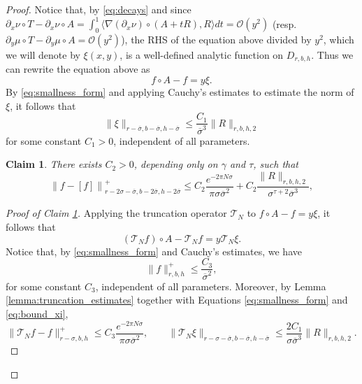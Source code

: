 \documentclass[10pt]{article}
\newtheorem{claim}{Claim}
\newcommand{\Domain}[3]{D_{#1, #2, #3}}
\begin{document}
\begin{proof}
 Notice that, by \eqref{eq:decays} and since $\partial_x\nu \circ T - \partial_x\nu \circ A = \int_0^1 \langle \nabla (\partial_x \nu) \circ (A + tR), R \rangle dt= \mathcal{O}(y^2)$ (resp. $\partial_y\mu \circ T - \partial_y\mu \circ A = \mathcal{O}(y^2)$), the RHS of the equation above divided by $y^2$, which we will denote by $\xi(x, y)$, is a well-defined analytic function on $\Domain{r}{b}{h}$. Thus we can rewrite the equation above as
\begin{equation}
\label{eq:difference_equation_mu_nu}
    f \circ A - f = y \xi.
\end{equation}
By \eqref{eq:smallness_form} and applying Cauchy's estimates to estimate the norm of $\xi$, it follows that 
 \begin{equation}
 \label{eq:bound_xi}
   \|\xi\|_{r - \overline\sigma, b - \overline\sigma, h - \overline \sigma} \leq  \frac{C_1}{\overline \sigma^3}\| R \|_{r,b,h,2}
 \end{equation} 
 for some constant $C_1 > 0$,  independent of all parameters. 
 
 \begin{claim}
 \label{cl:f_minus_average_scheme}
There exists $C_2 > 0$,  depending only on $\gamma$ and $\tau$, such that
\[\left\|f - [f] \right\|_{r - 2\sigma - \overline\sigma, b - 2\overline\sigma, h - 2\overline\sigma}^+ \leq C_2\frac{e^{-2\pi N \sigma}}{\pi \sigma \overline \sigma^2} + C_2\frac{\| R \|_{r,b,h,2}}{\sigma^{\tau + 2} \overline \sigma^3},\]
 \end{claim}
\begin{proof}[Proof of Claim \ref{cl:f_minus_average_scheme}] 
Applying the truncation operator $\mathcal{T}_N$ to $f \circ A - f = y \xi$, it follows that
\[ (\mathcal{T}_Nf) \circ A - \mathcal{T}_Nf = y \mathcal{T}_N\xi. \]
Notice that, by \eqref{eq:smallness_form} and Cauchy's estimates, we have
\[ \| f \|_{r, b, h}^+ \leq \frac{C_3}{\overline \sigma^2}, \]
for some constant $C_3$, independent of all parameters. Moreover, by Lemma \ref{lemma:truncation_estimates} together with Equations \eqref{eq:smallness_form} and \eqref{eq:bound_xi}, 
\[ \|\mathcal{T}_N f - f \|_{r - \sigma, b, h}^+ \leq C_3\frac{e^{-2\pi N \sigma}}{\pi \sigma \overline \sigma^2}, %
\qquad \|\mathcal{T}_N \xi \|_{r - \sigma - \overline\sigma, b - \overline\sigma, h - \overline\sigma} \leq \frac{2C_1}{\sigma \overline \sigma^3}\| R \|_{r,b,h,2}. \]


\end{proof}
\end{proof}
\end{document}
